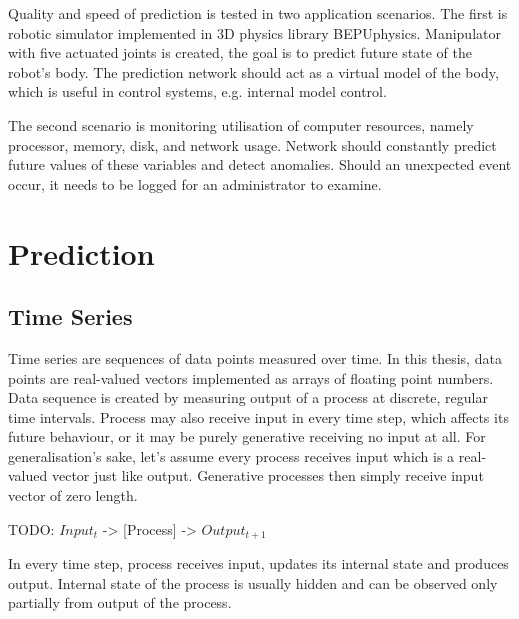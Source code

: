 \documentclass[12pt,oneside]{fithesis2}
\begin{document}
\par %
Quality and speed of prediction is tested in two application scenarios. The first is robotic simulator implemented in 3D physics library BEPUphysics. Manipulator with five actuated joints is created, the goal is to predict future state of the robot's body. The prediction network should act as a virtual model of the body, which is useful in control systems, e.g. internal model control.
\par %
The second scenario is monitoring utilisation of computer resources, namely processor, memory, disk, and network usage. Network should constantly predict future values of these variables and detect anomalies. Should an unexpected event occur, it needs to be logged for an administrator to examine.
\par

\chapter{Prediction}
\section{Time Series}
Time series are sequences of data points measured over time. In this thesis, data points are real-valued vectors implemented as arrays of floating point numbers. Data sequence is created by measuring output of a process at discrete, regular time intervals. %
Process may also receive input in every time step, which affects its future behaviour, or it may be purely generative receiving no input at all. For generalisation's sake, let's assume every process receives input which is a real-valued vector just like output. Generative processes then simply receive input vector of zero length.
\begin{center}
	TODO: $Input_t$ -> [Process] -> $Output_{t+1}$
\end{center}
In every time step, process receives input, updates its internal state and produces output. Internal state of the process is usually hidden and can be observed only partially from output of the process. %
\end{document}
